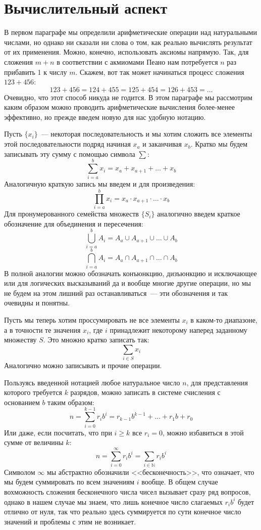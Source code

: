 \section{Вычислительный аспект}

В первом параграфе мы определили арифметические операции над натуральными числами, но однако ни сказали ни слова о том, как реально вычислять результат от их применения. Можно, конечно, использовать аксиомы напрямую. Так, для сложения $m+n$ в соответствии с акмиомами Пеано нам потребуется $n$ раз прибавить 1 к числу $m$. Скажем, вот так может начинаться процесс сложения $123+456$:
$$123+456 = 124 + 455 = 125 + 454 = 126 + 453 = \ldots$$
Очевидно, что этот способ никуда не годится. В этом параграфе мы рассмотрим каким образом можно проводить арифметические вычисления более-менее эффективно, но прежде введем новую для нас удобную нотацию.

Пусть $\{x_i\}$~--- некоторая последовательность и мы хотим сложить все элементы этой последовательности подряд начиная $x_a$ и заканчивая $x_b$. Кратко мы будем записывать эту сумму с помощью символа $\sum$:
$$\sum_{i=a}^b x_i = x_a + x_{a+1} + \ldots + x_b$$
Аналогичную краткую запись мы введем и для произведения:
$$\prod_{i=a}^b x_i = x_a \cdot x_{a+1} \cdot \ldots \cdot x_b$$
Для пронумерованного семейства множеств $\{S_i\}$ аналогично введем краткое обозначение для объединения и пересечения:
$$\bigcup_{i=a}^b A_i = A_a \cup A_{a+1}\cup\ldots\cup A_b$$
$$\bigcap_{i=a}^b A_i = A_a \cap A_{a+1}\cap\ldots\cap A_b$$
В полной аналогии можно обозначать конъюнкцию, дизъюнкцию и исключающее или  для логических высказываний да и вообще многие другие операции, но мы не будем на этом лишний раз останавливаться~--- эти обозначения и так очевидны и понятны.

Пусть мы теперь хотим проссумировать не все элементы $x_i$ в каком-то диапазоне, а в точности те значения $x_i$, где $i$ принадлежит некоторому наперед заданному множеству $S$. Это множно кратко записать так:
$$\sum_{i\in S} x_i$$
Аналогично можно записывать и прочие операции.

Пользуясь введенной нотацией любое натуральное число $n$, для представления которого требуется $k$ разрядов, можно записать в системе счисления с основанием $b$ таким образом:
$$n = \sum_{i=0}^{k-1} r_i b^i = r_{k - 1} b^{k-1} + \ldots + r_1 b + r_0$$
Или даже, если посчитать, что при $i\ge k$ все $r_i = 0$, можно избавиться в этой сумме от величины $k$:
$$n = \sum_{i=0}^\infty r_i b^i = \sum_{i\in\mathbb{N}} r_i b^i$$
Символом $\infty$ мы абстрактно обозначили <<бесконечность>>, что означает, что мы будем суммировать по всем значениям $i$ вообще. В общем случае вохможность сложения бесконечного числа чисел вызывает сразу ряд вопросов, однако в нашем случае мы знаем, что лишь конечное число слагаемых $r_ib^i$ будет отлично от нуля, так что реально здесь суммируется по сути конечное число значений и проблемы с этим не возникает.

